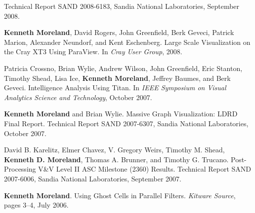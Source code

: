 \begin{enumerate}[label={[\arabic*]}, left=0pt]
Technical Report SAND 2008-6183, Sandia National Laboratories, September 2008.
\item  %
  \textbf{Kenneth Moreland}, David Rogers, John Greenfield, Berk Geveci, Patrick Marion, Alexander Neundorf, and Kent Eschenberg.
  Large Scale Visualization on the {Cray XT3} Using ParaView.
  In \emph{Cray User Group}, 2008.
\item  %
  Patricia Crossno, Brian Wylie, Andrew Wilson, John Greenfield, Eric Stanton, Timothy Shead, Lisa Ice, \textbf{Kenneth Moreland}, Jeffrey Baumes, and Berk Geveci.
  Intelligence Analysis Using Titan.
  In \emph{IEEE Symposium on Visual Analytics Science and Technology}, October 2007.
\item  %
  \textbf{Kenneth Moreland} and Brian Wylie.
  Massive Graph Visualization: LDRD Final Report.
Technical Report SAND 2007-6307, Sandia National Laboratories, October 2007.
\item  %
  David B. Karelitz, Elmer Chavez, V. Gregory Weirs, Timothy M. Shead, \textbf{Kenneth D. Moreland}, Thomas A. Brunner, and Timothy G. Trucano.
  Post-Processing {V\&V} Level {II} {ASC} Milestone (2360) Results.
Technical Report SAND 2007-6006, Sandia National Laboratories, September 2007.
\item  %
  \textbf{Kenneth Moreland}.
  Using Ghost Cells in Parallel Filters.
  \emph{Kitware Source}, pages 3--4, July 2006.
\end{enumerate}